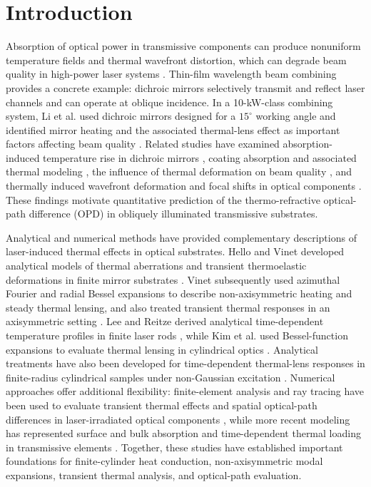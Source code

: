 \documentclass{optica-article}
\begin{document}
\section{Introduction}
Absorption of optical power in transmissive components can produce nonuniform temperature fields and thermal wavefront distortion, which can degrade beam quality in high-power laser systems \cite{mansell2001,soulier2026,li2025deformation,soulier2026mitigation,stubenvoll2014,schaefer2009}.
Thin-film wavelength beam combining provides a concrete example: dichroic mirrors selectively transmit and reflect laser channels and can operate at oblique incidence.
In a 10-kW-class combining system, Li et al. used dichroic mirrors designed for a $15^\circ$ working angle and identified mirror heating and the associated thermal-lens effect as important factors affecting beam quality \cite{li2024combining}.
Related studies have examined absorption-induced temperature rise in dichroic mirrors \cite{li2024}, coating absorption and associated thermal modeling \cite{soulier2025absorption}, the influence of thermal deformation on beam quality \cite{li2025deformation}, and thermally induced wavefront deformation and focal shifts in optical components \cite{soulier2026,soulier2026mitigation,stubenvoll2014,schaefer2009}.
These findings motivate quantitative prediction of the thermo-refractive optical-path difference (OPD) in obliquely illuminated transmissive substrates.

Analytical and numerical methods have provided complementary descriptions of laser-induced thermal effects in optical substrates.
Hello and Vinet developed analytical models of thermal aberrations and transient thermoelastic deformations in finite mirror substrates \cite{hellovinet1990,hellovinet1990transient}.
Vinet subsequently used azimuthal Fourier and radial Bessel expansions to describe non-axisymmetric heating and steady thermal lensing, and also treated transient thermal responses in an axisymmetric setting \cite{vinet2009}.
Lee and Reitze derived analytical time-dependent temperature profiles in finite laser rods \cite{lee2015}, while Kim et al. used Bessel-function expansions to evaluate thermal lensing in cylindrical optics \cite{kim2017}.
Analytical treatments have also been developed for time-dependent thermal-lens responses in finite-radius cylindrical samples under non-Gaussian excitation \cite{sabaeian2016}.
Numerical approaches offer additional flexibility: finite-element analysis and ray tracing have been used to evaluate transient thermal effects and spatial optical-path differences in laser-irradiated optical components \cite{borik1991}, while more recent modeling has represented surface and bulk absorption and time-dependent thermal loading in transmissive elements \cite{kurcsics2025}.
Together, these studies have established important foundations for finite-cylinder heat conduction, non-axisymmetric modal expansions, transient thermal analysis, and optical-path evaluation.
\end{document}
